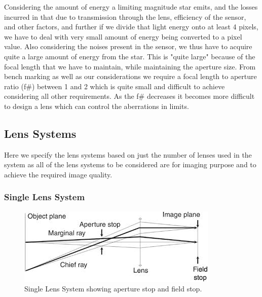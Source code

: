 \begin{itemize}
Considering the amount of energy a limiting magnitude star emits, and the losses incurred in that due to transmission through the lens, efficiency of the sensor, and other factors, and further if we divide that light energy onto at least 4 pixels, we have to deal with very small amount of energy being converted to a pixel value. Also considering the noises present in the sensor, we thus have to acquire quite a large amount of energy from the star.
This is "quite large" because of the focal length that we have to maintain, while maintaining the aperture size. From bench marking as well as our considerations we require a focal length to aperture ratio (f\#) between 1 and 2 which is quite small and difficult to achieve considering all other requirements. As the f\# decreases it becomes more difficult to design a lens which can control the aberrations in limits.
\end{itemize}

\subsection{Lens Systems}
Here we specify the lens systems based on just the number of lenses used in the system as all of the lens systems to be considered are for imaging purpose and to achieve the required image quality.
\subsubsection{Single Lens System}
\graphicspath{}
\begin{figure}[h!]
    \centering
    \includegraphics{Figures/Instrumentation/single_lens_system.jpg}
    \caption{Single Lens System showing aperture stop and field stop.}
    \label{fig:8.1}
\end{figure}
